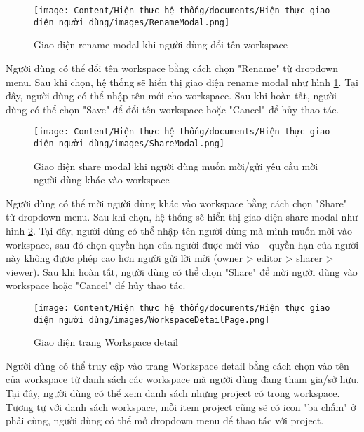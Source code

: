 \begin{figure}[H]
    \centering
    \texttt{[image: Content/Hiện thực hệ thống/documents/Hiện thực giao diện người dùng/images/RenameModal.png]}
    \vspace{0.5cm}
    \caption{Giao diện rename modal khi người dùng đổi tên workspace}
    \label{fig: Giao diện rename modal khi người dùng đổi tên workspace}
\end{figure}

Người dùng có thể đổi tên workspace bằng cách chọn "Rename" từ dropdown menu. Sau khi chọn, hệ thống sẽ hiển thị giao diện rename modal như hình \ref{fig: Giao diện rename modal khi người dùng đổi tên workspace}. Tại đây, người dùng có thể nhập tên mới cho workspace. Sau khi hoàn tất, người dùng có thể chọn "Save" để đổi tên workspace hoặc "Cancel" để hủy thao tác.

\begin{figure}[H]
    \centering
    \texttt{[image: Content/Hiện thực hệ thống/documents/Hiện thực giao diện người dùng/images/ShareModal.png]}
    \vspace{0.5cm}
    \caption{Giao diện share modal khi người dùng muốn mời/gửi yêu cầu mời người dùng khác vào workspace}
    \label{fig: Giao diện share modal khi người dùng muốn mời/gửi yêu cầu mời người dùng khác vào workspace}
\end{figure}

Người dùng có thể mời người dùng khác vào workspace bằng cách chọn "Share" từ dropdown menu. Sau khi chọn, hệ thống sẽ hiển thị giao diện share modal như hình \ref{fig: Giao diện share modal khi người dùng muốn mời/gửi yêu cầu mời người dùng khác vào workspace}. Tại đây, người dùng có thể nhập tên người dùng mà mình muốn mời vào workspace, sau đó chọn quyền hạn của người được mời vào - quyền hạn của người này không được phép cao hơn người gửi lời mời (owner > editor > sharer > viewer). Sau khi hoàn tất, người dùng có thể chọn "Share" để mời người dùng vào workspace hoặc "Cancel" để hủy thao tác.

\begin{figure}[H]
    \centering
    \texttt{[image: Content/Hiện thực hệ thống/documents/Hiện thực giao diện người dùng/images/WorkspaceDetailPage.png]}
    \vspace{0.5cm}
    \caption{Giao diện trang Workspace detail}
    \label{fig: Giao diện trang Workspace detail}
\end{figure}

Người dùng có thể truy cập vào trang Workspace detail bằng cách chọn vào tên của workspace từ danh sách các workspace mà người dùng đang tham gia/sở hữu. Tại đây, người dùng có thể xem danh sách những project có trong workspace. Tương tự với danh sách workspace, mỗi item project cũng sẽ có icon "ba chấm" ở phải cùng, người dùng có thể mở dropdown menu để thao tác với project.

